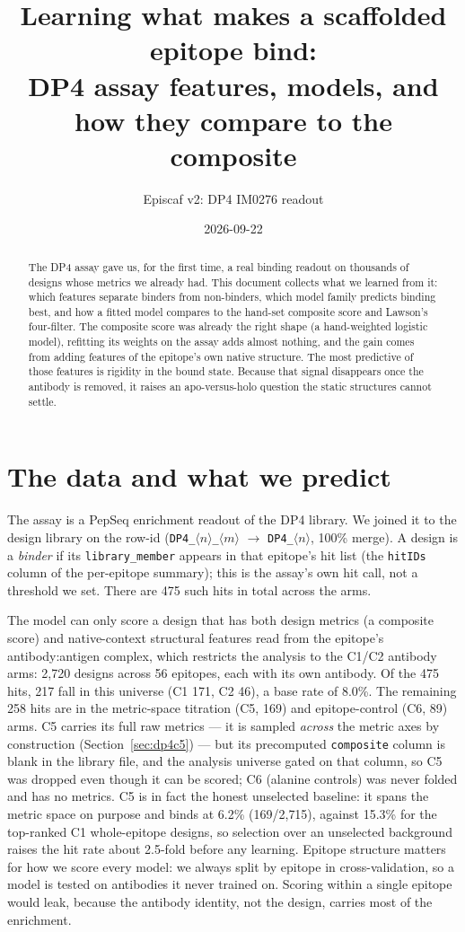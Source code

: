 \documentclass[11pt]{article}
\title{Learning what makes a scaffolded epitope bind:\\
DP4 assay features, models, and how they compare to the composite}
\author{Episcaf v2: DP4 IM0276 readout}
\date{2026-09-22}
\begin{document}
\maketitle

\begin{abstract}
\noindent
The DP4 assay gave us, for the first time, a real binding readout on thousands of designs whose
metrics we already had. This document collects what we learned from it: which features separate
binders from non-binders, which model family predicts binding best, and how a fitted model compares
to the hand-set composite score and Lawson's four-filter. The composite score
was already the right shape (a hand-weighted logistic model), refitting its weights on the assay adds
almost nothing, and the gain comes from adding features of the epitope's own native structure.
The most predictive of those features is rigidity in the bound state. Because that signal disappears
once the antibody is removed, it raises an apo-versus-holo question the static structures cannot settle.
\end{abstract}

\section{The data and what we predict}

The assay is a PepSeq enrichment readout of the DP4 library. We joined it to the design library on the
row-id (\texttt{DP4\_$\langle n\rangle$\_$\langle m\rangle$} $\to$ \texttt{DP4\_$\langle n\rangle$},
100\% merge). A design is a \emph{binder} if its \texttt{library\_member} appears in that epitope's hit
list (the \texttt{hitIDs} column of the per-epitope summary); this is the assay's own hit call, not a
threshold we set. There are 475 such hits in total across the arms.

The model can only score a design that has both design metrics (a composite score) and native-context
structural features read from the epitope's antibody:antigen complex, which restricts the analysis to
the C1/C2 antibody arms: 2{,}720 designs across 56 epitopes, each with its own antibody. Of the 475 hits,
217 fall in this universe (C1 171, C2 46), a base rate of 8.0\%. The remaining 258 hits are in the
metric-space titration (C5, 169) and epitope-control (C6, 89) arms. C5 carries its full raw metrics ---
it is sampled \emph{across} the metric axes by construction (Section~\ref{sec:dp4c5}) --- but its
precomputed \texttt{composite} column is blank in the library file, and the analysis universe gated on
that column, so C5 was dropped even though it can be scored; C6 (alanine controls) was never folded and
has no metrics. C5 is in fact the honest unselected baseline: it spans the metric space on purpose and
binds at 6.2\% (169/2{,}715), against 15.3\% for the top-ranked C1 whole-epitope designs, so selection
over an unselected background raises the hit rate about 2.5-fold before any learning. Epitope structure matters for how we score every model: we always
split by epitope in cross-validation, so a model is tested on antibodies it never trained on. Scoring
within a single epitope would leak, because the antibody identity, not the design, carries most of the
enrichment.
\end{document}
